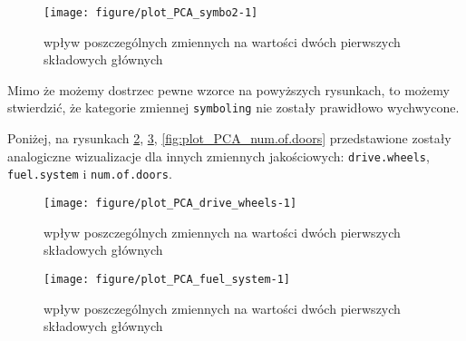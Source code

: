 \documentclass[12pt, a4paper]{article}\usepackage[]{graphicx}\usepackage[]{xcolor}
\makeatletter
\def\maxwidth{ %
  \ifdim\Gin@nat@width>\linewidth
    \linewidth
  \else
    \Gin@nat@width
  \fi
}
\newenvironment{kframe}{%
 \def\at@end@of@kframe{}%
 \ifinner\ifhmode%
  \def\at@end@of@kframe{\end{minipage}}%
  \begin{minipage}{\columnwidth}%
 \fi\fi%
 \def\FrameCommand##1{\hskip\@totalleftmargin \hskip-\fboxsep
 \colorbox{shadecolor}{##1}\hskip-\fboxsep
     \hskip-\linewidth \hskip-\@totalleftmargin \hskip\columnwidth}%
 \MakeFramed {\advance\hsize-\width
   \@totalleftmargin\z@ \linewidth\hsize
   \@setminipage}}%
 {\par\unskip\endMakeFramed%
 \at@end@of@kframe}
\newenvironment{knitrout}{}{} %
\makeatother
\begin{document}
\begin{knitrout}
\color{fgcolor}\begin{figure}[H]

{\centering \texttt{[image: figure/plot\_PCA\_symbo2-1]} 

}

\caption[wpływ poszczególnych zmiennych na wartości dwóch pierwszych składowych głównych]{wpływ poszczególnych zmiennych na wartości dwóch pierwszych składowych głównych}\label{fig:plot_PCA_symbo2}
\end{figure}

\end{knitrout}

Mimo że możemy dostrzec pewne wzorce na powyższych rysunkach, to możemy stwierdzić, że kategorie zmiennej \texttt{symboling} nie zostały prawidłowo wychwycone.
\par Poniżej, na rysunkach \ref{fig:plot_PCA_drive.wheels}, \ref{fig:plot_PCA_fuel.system}, \ref{fig:plot_PCA_num.of.doors} przedstawione zostały analogiczne wizualizacje dla innych zmiennych jakościowych: \texttt{drive.wheels}, \texttt{fuel.system} i \texttt{num.of.doors}.

\begin{knitrout}
\color{fgcolor}\begin{figure}[H]

{\centering \texttt{[image: figure/plot\_PCA\_drive\_wheels-1]} 

}

\caption[wpływ poszczególnych zmiennych na wartości dwóch pierwszych składowych głównych]{wpływ poszczególnych zmiennych na wartości dwóch pierwszych składowych głównych}\label{fig:plot_PCA_drive.wheels}
\end{figure}

\end{knitrout}

\begin{knitrout}
\color{fgcolor}\begin{kframe}


{\ttfamily\noindent\itshape\color{messagecolor}{\#\# Too few points to calculate an ellipse\\\#\# Too few points to calculate an ellipse\\\#\# Too few points to calculate an ellipse}}\end{kframe}\begin{figure}[H]

{\centering \texttt{[image: figure/plot\_PCA\_fuel\_system-1]} 

}

\caption[wpływ poszczególnych zmiennych na wartości dwóch pierwszych składowych głównych]{wpływ poszczególnych zmiennych na wartości dwóch pierwszych składowych głównych}\label{fig:plot_PCA_fuel.system}
\end{figure}

\end{knitrout}
\end{document}
